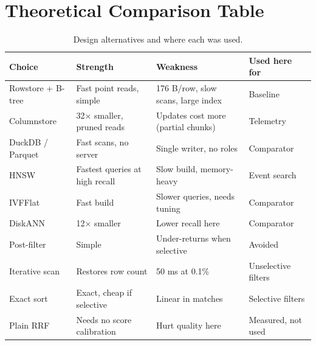 \documentclass[11pt,a4paper]{article}
\begin{document}
\section{Theoretical Comparison Table}
\begin{table}[H]
\centering
\small
\renewcommand{\arraystretch}{1.25}
\begin{tabular}{p{2.8cm}p{3.5cm}p{3.5cm}p{3.5cm}}
\toprule
Choice & Strength & Weakness & Used here for\\
\midrule
Rowstore + B-tree & Fast point reads, simple & 176 B/row, slow scans, large index & Baseline\\
Columnstore & 32$\times$ smaller, pruned reads & Updates cost more (partial chunks) & Telemetry\\
DuckDB / Parquet & Fast scans, no server & Single writer, no roles & Comparator\\
HNSW & Fastest queries at high recall & Slow build, memory-heavy & Event search\\
IVFFlat & Fast build & Slower queries, needs tuning & Comparator\\
DiskANN & 12$\times$ smaller & Lower recall here & Comparator\\
Post-filter & Simple & Under-returns when selective & Avoided\\
Iterative scan & Restores row count & 50 ms at 0.1\% & Unselective filters\\
Exact sort & Exact, cheap if selective & Linear in matches & Selective filters\\
Plain RRF & Needs no score calibration & Hurt quality here & Measured, not used\\
\bottomrule
\end{tabular}
\caption{Design alternatives and where each was used.}
\end{table}

\end{document}
